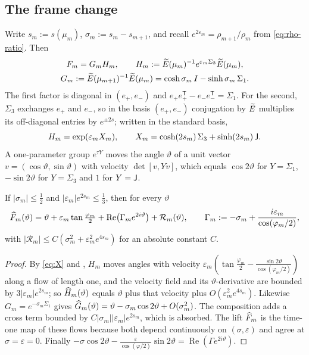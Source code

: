 \subsection{The frame change}

Write $s_m:=s(\mu_m)$, $\sigma_m:=s_m-s_{m+1}$, and recall
$e^{2\varepsilon_m}=\rho_{m+1}/\rho_m$ from \eqref{eq:rho-ratio}. Then
\begin{gather*}
  F_m=G_mH_m,\qquad H_m:=\widetilde E(\mu_m)^{-1}e^{\varepsilon_m\Sigma_3}\widetilde E(\mu_m),\\
  G_m:=\widetilde E(\mu_{m+1})^{-1}\widetilde E(\mu_m)=\cosh\sigma_m\,I-\sinh\sigma_m\,\Sigma_1 .
\end{gather*}
The first factor is diagonal in $(e_+,e_-)$ and $e_+e_+^{\mathsf T}-e_-e_-^{\mathsf T}=\Sigma_1$.
For the second, $\Sigma_3$ exchanges $e_+$ and $e_-$, so in the basis $(e_+,e_-)$
conjugation by $\widetilde E$ multiplies its off-diagonal entries by $e^{\pm2s}$; written in the
standard basis,
\begin{equation}\label{eq:X}
  H_m=\exp(\varepsilon_mX_m),\qquad X_m=\cosh(2s_m)\,\Sigma_3+\sinh(2s_m)\,\mathsf{J} .
\end{equation}
A one-parameter group $e^{\tau Y}$ moves the angle $\vartheta$ of a unit vector
$v=(\cos\vartheta,\sin\vartheta)$ with velocity $\det[v,Yv]$, which equals $\cos2\vartheta$
for $Y=\Sigma_1$, $-\sin2\vartheta$ for $Y=\Sigma_3$ and $1$ for $Y=\mathsf{J}$.

\begin{lemma}\label{lem:frame}
If $|\sigma_m|\le\frac12$ and $|\varepsilon_m|e^{2s_m}\le\frac13$, then for every $\vartheta$
\[
  \widehat F_m(\vartheta)=\vartheta+\varepsilon_m\tan\tfrac{\varphi_m}{2}
  +\operatorname{Re}\bigl(\Gamma_me^{2i\vartheta}\bigr)+\mathcal R_m(\vartheta),\qquad
  \Gamma_m:=-\sigma_m+\frac{i\varepsilon_m}{\cos(\varphi_m/2)},
\]
with $|\mathcal R_m|\le C(\sigma_m^2+\varepsilon_m^2e^{4s_m})$ for an absolute constant $C$.
\end{lemma}

\begin{proof}
By \eqref{eq:X} and , $H_m$ moves angles with velocity
$\varepsilon_m(\tan\frac{\varphi_m}2-\frac{\sin2\vartheta}{\cos(\varphi_m/2)})$ along a flow
of length one, and the velocity field and its $\vartheta$-derivative are bounded by
$3|\varepsilon_m|e^{2s_m}$; so $\widehat H_m(\vartheta)$ equals $\vartheta$ plus that velocity
plus $O(\varepsilon_m^2e^{4s_m})$. Likewise $G_m=e^{-\sigma_m\Sigma_1}$ gives
$\widehat G_m(\vartheta)=\vartheta-\sigma_m\cos2\vartheta+O(\sigma_m^2)$. The composition adds a
cross term bounded by $C|\sigma_m||\varepsilon_m|e^{2s_m}$, which is absorbed. The lift
$\widehat F_m$ is the time-one map of these flows because both depend continuously on
$(\sigma,\varepsilon)$ and agree at $\sigma=\varepsilon=0$. Finally
$-\sigma\cos2\vartheta-\frac{\varepsilon}{\cos(\varphi/2)}\sin2\vartheta
=\operatorname{Re}(\Gamma e^{2i\vartheta})$.
\end{proof}

